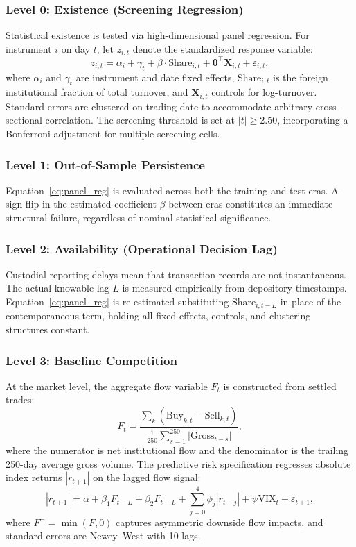 \documentclass{ieeeaccess}
\begin{document}
\subsubsection{Level 0: Existence (Screening Regression)}
Statistical existence is tested via high-dimensional panel regression. For instrument $i$ on day $t$, let $z_{i,t}$ denote the standardized response variable:
\begin{equation}
z_{i,t} = \alpha_i + \gamma_t + \beta \cdot \text{Share}_{i,t} + \bm{\theta}^\top \mathbf{X}_{i,t} + \varepsilon_{i,t},
\label{eq:panel_reg}
\end{equation}
where $\alpha_i$ and $\gamma_t$ are instrument and date fixed effects, $\text{Share}_{i,t}$ is the foreign institutional fraction of total turnover, and $\mathbf{X}_{i,t}$ controls for log-turnover. Standard errors are clustered on trading date to accommodate arbitrary cross-sectional correlation. The screening threshold is set at $|t| \ge 2.50$, incorporating a Bonferroni adjustment for multiple screening cells.

\subsubsection{Level 1: Out-of-Sample Persistence}
Equation~\eqref{eq:panel_reg} is evaluated across both the training and test eras. A sign flip in the estimated coefficient $\beta$ between eras constitutes an immediate structural failure, regardless of nominal statistical significance.

\subsubsection{Level 2: Availability (Operational Decision Lag)}
Custodial reporting delays mean that transaction records are not instantaneous. The actual knowable lag $L$ is measured empirically from depository timestamps. Equation~\eqref{eq:panel_reg} is re-estimated substituting $\text{Share}_{i,t-L}$ in place of the contemporaneous term, holding all fixed effects, controls, and clustering structures constant.

\subsubsection{Level 3: Baseline Competition}
At the market level, the aggregate flow variable $F_t$ is constructed from settled trades:
\begin{equation}
F_t = \frac{\sum_{k} (\text{Buy}_{k,t} - \text{Sell}_{k,t})}{\frac{1}{250}\sum_{s=1}^{250} |\text{Gross}_{t-s}|},
\label{eq:market_flow}
\end{equation}
where the numerator is net institutional flow and the denominator is the trailing 250-day average gross volume. The predictive risk specification regresses absolute index returns $|r_{t+1}|$ on the lagged flow signal:
\begin{equation}
|r_{t+1}| = \alpha + \beta_1 F_{t-L} + \beta_2 F_{t-L}^- + \sum_{j=0}^{4} \phi_j |r_{t-j}| + \psi \text{VIX}_t + \varepsilon_{t+1},
\label{eq:risk_reg}
\end{equation}
where $F^- = \min(F, 0)$ captures asymmetric downside flow impacts, and standard errors are Newey--West with 10 lags.
\end{document}
